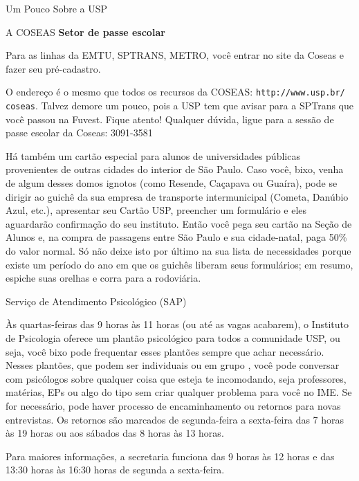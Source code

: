 \begin{secao}{Um Pouco Sobre a USP}
\begin{subsecao}{A COSEAS}
{\bf Setor de passe escolar}

Para as linhas da EMTU, SPTRANS, METRO, você entrar no site da Coseas e fazer
seu pré-cadastro. 

O endereço é o mesmo que todos os recursos da COSEAS: {\tt http://www.usp.br/
coseas}. Talvez demore um pouco, pois a USP tem 
que avisar para a SPTrans que você passou na Fuvest. Fique atento! Qualquer 
dúvida, ligue para a sessão de passe escolar da Coseas: 3091-3581 

Há também um cartão especial para alunos de universidades públicas provenientes
de outras cidades do interior de São Paulo. Caso você, bixo, venha de algum desses domos ignotos
(como Resende, Caçapava ou Guaíra), pode se dirigir ao guichê da sua empresa de
transporte intermunicipal (Cometa, Danúbio Azul, etc.), apresentar seu Cartão USP,
preencher um formulário e eles aguardarão confirmação do seu instituto. Então
você pega seu cartão na Seção de Alunos e, na compra de passagens entre São Paulo
e sua cidade-natal, paga 50\% do valor normal. Só não deixe isto por último na
sua lista de necessidades porque existe um período do ano em que os guichês
liberam seus formulários; em resumo, espiche suas orelhas e corra para a rodoviária.

\end{subsecao}

\begin{subsecao}{Serviço de Atendimento Psicológico (SAP)}

Às quartas-feiras das 9 horas às 11 horas (ou até as vagas acabarem),
o Instituto de Psicologia oferece um plantão psicológico para todos a
comunidade USP, ou seja, você bixo pode frequentar esses plantões sempre
que achar necessário. Nesses plantões, que podem ser individuais ou em grupo
, você pode conversar com psicólogos sobre qualquer coisa que esteja te
incomodando, seja professores, matérias, EPs ou algo do tipo sem criar qualquer
problema para você no IME. Se for necessário, pode haver processo de
encaminhamento ou retornos para novas entrevistas. Os retornos são marcados de
segunda-feira a sexta-feira das 7 horas às 19 horas ou aos sábados das
8 horas às 13 horas.

Para maiores informações, a secretaria funciona das 9 horas às 12 horas e das
13:30 horas às 16:30 horas de segunda a sexta-feira. 
 
\end{subsecao}



\end{secao}
